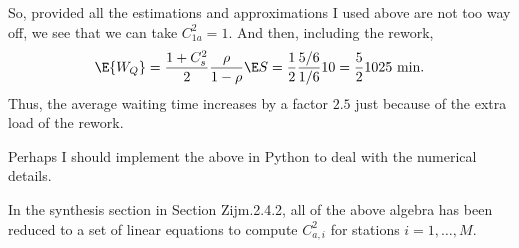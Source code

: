 \begin{exercise}
\begin{solution}
So, provided all the estimations and approximations I used above are
not too way off, we see that we can take $C_{1a}^2=1$. And then, including the rework,
  \begin{equation*}
    \E{W_Q} = \frac{1+C_s^2}2 \frac{\rho}{1-\rho} \E S = \frac 12 \frac{5/6}{1/6} 10 = \frac 52 10 25 \text{ min}.
  \end{equation*}
  Thus, the average waiting time increases by a factor $2.5$ just
  because of the extra load of the rework.  

  Perhaps I should implement the above in Python to deal with the
  numerical details.

  In the synthesis section in Section Zijm.2.4.2, all of the above
  algebra has been reduced to a set of linear equations to compute
  $C_{a,i}^2$ for stations $i=1,\ldots,M$.
\end{solution}
\end{exercise}




